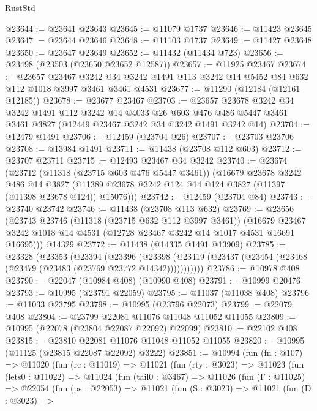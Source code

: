 \begin{lexlean}{RustStd}
\begin{coremodule}
@23644 := @23641 @23643
@23645 := @11079 @1737
@23646 := @11423 @23645
@23647 := @23644 @23646
@23648 := @11103 @1737
@23649 := @11427 @23648
@23650 := @23647 @23649
@23652 := @11432 (@11434 @723)
@23656 := @23498 (@23503 (@23650 @23652 @12587))
@23657 := @11925 @23467
@23674 := @23657
    @23467
    @3242
    @34
    @3242
    @1491
    @113
    @3242
    @14
    @5452
    @84
    @632
    @112
    @1018
    @3997
    @3461
    @3461
    @4531
@23677 := @11290 (@12184 (@12161 @12185))
@23678 := @23677 @23467
@23703 := @23657
    @23678
    @3242
    @34
    @3242
    @1491
    @112
    @3242
    @14
    @4033
    @26
    @603
    @476
    @486
    @5447
    @3461
    @3461
    @3827
    (@12449 @23467 @3242 @34 @3242 @1491 @3242 @14)
@23704 := @12479 @1491
@23706 := @12459 (@23704 @26)
@23707 := @23703 @23706
@23708 := @13984 @1491
@23711 := @11438 (@23708 @112 @603)
@23712 := @23707 @23711
@23715 := @12493 @23467 @34 @3242
@23740 := @23674
    (@23712
      (@11318 (@23715 @603 @476 @5447 @3461))
      (@16679
        @23678
        @3242
        @486
        @14
        @3827
        (@11389 @23678 @3242 @124 @14 @124 @3827 (@11397 (@11398 @23678 @124)) @15076)))
@23742 := @12459 (@23704 @84)
@23743 := @23740 @23742
@23746 := @11438 (@23708 @113 @632)
@23769 := @23656
    (@23743
      @23746
      (@11318 (@23715 @632 @112 @3997 @3461))
      (@16679 @23467 @3242 @1018 @14 @4531 (@12728 @23467 @3242 @14 @1017 @4531 @16691 @16695)))
    @14329
@23772 := @11438 (@14335 @1491 @13909)
@23785 := @23328
    (@23353
      (@23394
        (@23396
          (@23398 (@23419 (@23437 (@23454 (@23468 (@23479 (@23483 (@23769 @23772 @14342)))))))))))
@23786 := @10978 @408
@23790 := @22047 (@10984 @408) (@10990 @408)
@23791 := @10999 @20476
@23793 := @10995 (@23791 @22059)
@23795 := @11037 (@11038 @408)
@23796 := @11033 @23795
@23798 := @10995 (@23796 @22073)
@23799 := @22079 @408
@23804 := @23799 @22081 @11076 @11048 @11052 @11055
@23809 := @10995 (@22078 (@23804 @22087 @22092) @22099)
@23810 := @22102 @408
@23815 := @23810 @22081 @11076 @11048 @11052 @11055
@23820 := @10995 (@11125 (@23815 @22087 @22092) @3222)
@23851 := @10994
    (fun (fn : @107) =>
    @11020
      (fun (rc : @11019) =>
      @11021
        (fun (rty : @3023) =>
        @11023
          (fun (lets0 : @11022) =>
          @11024
            (fun (tail0 : @3467) =>
            @11026
              (fun (Γ : @11025) =>
              @22054
                (fun (ps : @22053) =>
                @11021
                  (fun (S : @3023) =>
                  @11021
                    (fun (D : @3023) =>

\end{coremodule}
\end{lexlean}
